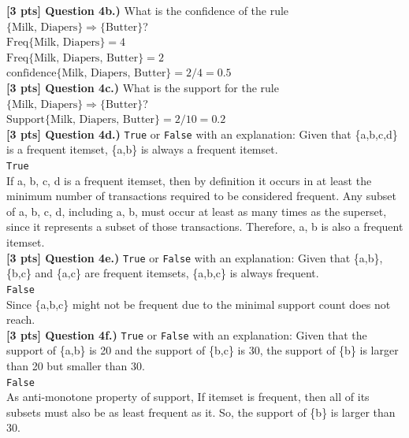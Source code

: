 \documentclass[paper=a4, fontsize=11pt]{scrartcl} %
\begin{document}
\textbf{[3 pts] Question 4b.)} What is the confidence of the rule $\{ \text{Milk, Diapers} \} \Rightarrow \{ \text{Butter} \}$? \\

$\text{Freq\{Milk, Diapers\}} = 4$ \\
$\text{Freq\{Milk, Diapers, Butter\}} = 2$ \\ 
$\text{confidence\{Milk, Diapers, Butter\}} = 2/4 = 0.5$ \\

\textbf{[3 pts] Question 4c.)} What is the support for the rule $\{ \text{Milk, Diapers} \} \Rightarrow \{ \text{Butter} \}$? \\


$\text{Support\{Milk, Diapers, Butter\}} = 2/10 = 0.2$ \\

\textbf{[3 pts] Question 4d.)} \verb"True" or \verb"False" with an explanation: Given that \{a,b,c,d\} is a frequent itemset, \{a,b\} is always a frequent itemset. \\

\verb"True" \\
If {a, b, c, d} is a frequent itemset, then by definition it occurs in at least the minimum number of transactions required to be considered frequent. Any subset of {a, b, c, d}, including {a, b}, must occur at least as many times as the superset, since it represents a subset of those transactions. Therefore, {a, b} is also a frequent itemset. \\

\textbf{[3 pts] Question 4e.)} \verb"True" or \verb"False" with an explanation: Given that \{a,b\}, \{b,c\} and \{a,c\} are frequent itemsets, \{a,b,c\} is always frequent. \\

\verb"False" \\
Since \{a,b,c\} might not be frequent due to the minimal support count does not reach. \\

\textbf{[3 pts] Question 4f.)} \verb"True" or \verb"False" with an explanation: Given that the support of \{a,b\} is 20 and the support of \{b,c\} is 30, the support of \{b\} is larger than 20 but smaller than 30. \\

\verb"False" \\
As anti-monotone property of support, 
If itemset is frequent, then all of its subsets must also be as least frequent as it. 
So, the support of \{b\} is larger than 30. \\
\end{document}
